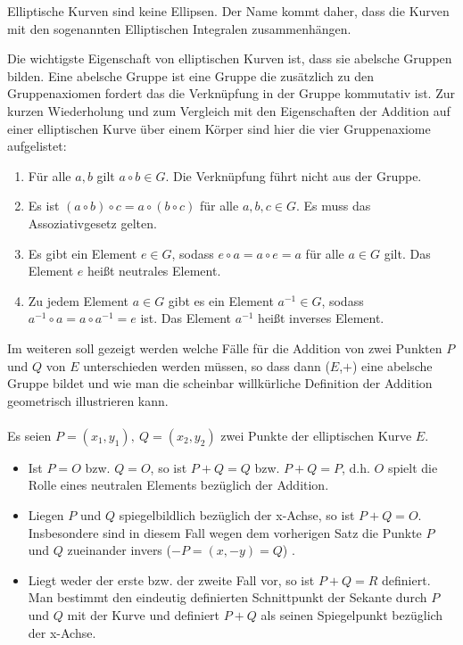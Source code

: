 \documentclass[a4paper,11pt]{article}
\begin{document}
Elliptische Kurven sind keine Ellipsen. Der Name kommt daher, dass die Kurven
mit den sogenannten Elliptischen Integralen zusammenhängen. 

Die wichtigste Eigenschaft von elliptischen Kurven ist, dass sie abelsche 
Gruppen bilden. Eine abelsche Gruppe ist eine Gruppe die zusätzlich zu den 
Gruppenaxiomen fordert das die Verknüpfung in der Gruppe kommutativ ist. Zur 
kurzen Wiederholung und zum Vergleich mit den Eigenschaften der Addition auf 
einer elliptischen Kurve über einem Körper sind hier die vier Gruppenaxiome
aufgelistet:
\begin{enumerate}
\item Für alle $a, b$ gilt $a\circ b\in G$. Die Verknüpfung führt nicht aus
        der Gruppe.
\item Es ist $(a\circ b)\circ c = a\circ (b\circ c)$ für alle $a,b,c\in G$. 
        Es muss das Assoziativgesetz gelten.
\item Es gibt ein Element $e\in G$, sodass $e\circ a = a\circ e = a$ für alle
        $a\in G$ gilt. Das Element $e$ heißt neutrales Element.
\item Zu jedem Element $a\in G$ gibt es ein Element $a^{-1}\in G$, sodass
        $a^{-1}\circ a= a\circ a^{-1} = e$ ist. Das Element $a^{-1}$ heißt 
        inverses Element.
\end{enumerate}

Im weiteren soll gezeigt werden welche Fälle für die Addition 
von zwei Punkten $P$ und $Q$ von $E$ unterschieden werden müssen, so dass dann
($E$,$+$) eine abelsche Gruppe bildet und wie man die scheinbar willkürliche
Definition der Addition geometrisch illustrieren kann. \\\\
Es seien $P=(x_1, y_1),\ Q=(x_2, y_2)$ zwei Punkte der elliptischen Kurve $E$.
\begin{itemize}
\item Ist $P=O$ bzw. $Q=O$, so ist $P+Q = Q$ bzw. $P+Q=P$, d.h. $O$ spielt die
        Rolle eines neutralen Elements bezüglich der Addition.

\item Liegen $P$ und $Q$ spiegelbildlich bezüglich der x-Achse, so ist $P+Q=O$.
        Insbesondere sind in diesem Fall wegen dem vorherigen Satz die Punkte 
        $P$ und $Q$ zueinander invers ($ -P=(x,-y) = Q $) .
\item Liegt weder der erste bzw. der zweite Fall vor, so ist $P+Q = R$ definiert.
        Man bestimmt den eindeutig definierten Schnittpunkt der Sekante durch 
        $P$ und $Q$ mit der Kurve und definiert $P+Q$ als seinen Spiegelpunkt
        bezüglich der x-Achse.

\end{itemize}
\end{document}
